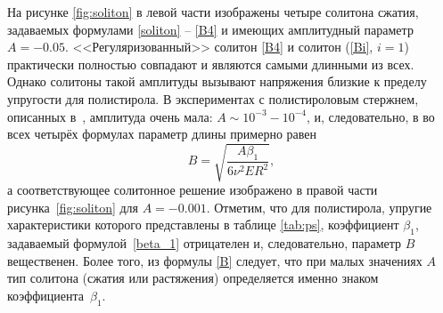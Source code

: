 \documentclass[12pt, a4paper]{report}
\begin{document}
На рисунке \ref{fig:soliton} в левой части изображены четыре солитона сжатия, задаваемых формулами \eqref{soliton} -- \eqref{B4} и имеющих амплитудный параметр $A = -0.05$.  <<Регуляризованный>> солитон \eqref{B4} и солитон (\ref{Bi}, $i=1$) практически полностью совпадают и являются самыми длинными из всех.
Однако солитоны такой амплитуды вызывают напряжения близкие к пределу упругости для полистирола. В экспериментах с полистироловым стержнем, описанных в~\cite{Garbuzov}, амплитуда очень мала: $A \sim 10^{-3} - 10^{-4}$, и, следовательно, в во всех четырёх формулах параметр длины примерно равен
\begin{equation}\label{B}
B = \sqrt{\frac{A\beta_1}{6\nu^2 E R^2}},
\end{equation}
а соответствующее солитонное решение изображено в правой части рисунка~\ref{fig:soliton} для $A = -0.001$.
Отметим, что для полистирола, упругие характеристики которого представлены в таблице \ref{tab:ps}, коэффициент $\beta_1$, задаваемый формулой~\eqref{beta_1} отрицателен и, следовательно, параметр $B$ вещественен. Более того, из формулы \eqref{B} следует, что при малых значениях $A$ тип солитона (сжатия или растяжения) определяется именно знаком коэффициента~$\beta_1$.
\end{document}
